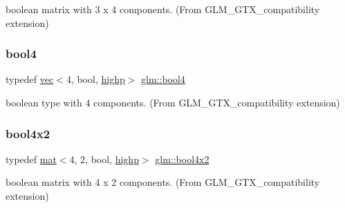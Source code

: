 boolean matrix with 3 x 4 components. (From G\+L\+M\+\_\+\+G\+T\+X\+\_\+compatibility extension) 

\mbox{\label{group__gtx__compatibility_ga16892e963e3aa2aa6c826a508d2df3ce}} 
\subsubsection{\texorpdfstring{bool4}{bool4}}
{\footnotesize\ttfamily typedef \mbox{\hyperlink{structglm_1_1vec}{vec}}$<$4, bool, \mbox{\hyperlink{namespaceglm_a36ed105b07c7746804d7fdc7cc90ff25ac6f7eab42eacbb10d59a58e95e362074}{highp}}$>$ \mbox{\hyperlink{group__gtx__compatibility_ga16892e963e3aa2aa6c826a508d2df3ce}{glm\+::bool4}}}



boolean type with 4 components. (From G\+L\+M\+\_\+\+G\+T\+X\+\_\+compatibility extension) 

\mbox{\label{group__gtx__compatibility_gaad9844846cb1d1f74c4b00ddb8e582ef}} 
\subsubsection{\texorpdfstring{bool4x2}{bool4x2}}
{\footnotesize\ttfamily typedef \mbox{\hyperlink{structglm_1_1mat}{mat}}$<$4, 2, bool, \mbox{\hyperlink{namespaceglm_a36ed105b07c7746804d7fdc7cc90ff25ac6f7eab42eacbb10d59a58e95e362074}{highp}}$>$ \mbox{\hyperlink{group__gtx__compatibility_gaad9844846cb1d1f74c4b00ddb8e582ef}{glm\+::bool4x2}}}



boolean matrix with 4 x 2 components. (From G\+L\+M\+\_\+\+G\+T\+X\+\_\+compatibility extension) 

\mbox{\label{group__gtx__compatibility_gab1a5519fb12e67d9940fa4d9b4590198}} 
